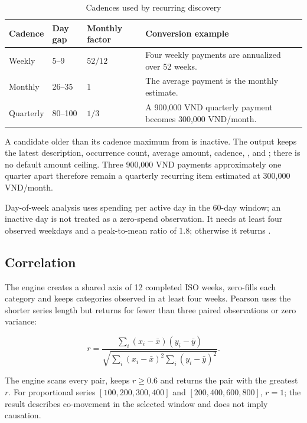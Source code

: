 \begin{table}[H]
  \centering
  \caption{Cadences used by recurring discovery}
  \label{tab:app-cadences}
  \begin{tabularx}{0.9\textwidth}{@{}L{3.2cm}C{2.4cm}C{2.4cm}C{3.2cm}@{}}
    \toprule
    \textbf{Cadence} & \textbf{Day gap} & \textbf{Monthly factor} & \textbf{Conversion example} \\
    \midrule
    Weekly & 5--9 & $52/12$ & Four weekly payments are annualized over 52 weeks. \\
    Monthly & 26--35 & $1$ & The average payment is the monthly estimate. \\
    Quarterly & 80--100 & $1/3$ & A 900,000 VND quarterly payment becomes 300,000 VND/month. \\
    \bottomrule
  \end{tabularx}
\end{table}

A candidate older than its cadence maximum from  is inactive. The output keeps the latest description, occurrence count, average amount, cadence, ,  and ; there is no default amount ceiling. Three 900,000 VND payments approximately one quarter apart therefore remain a quarterly recurring item estimated at 300,000 VND/month.

Day-of-week analysis uses spending per active day in the 60-day window; an inactive day is not treated as a zero-spend observation. It needs at least four observed weekdays and a peak-to-mean ratio of 1.8; otherwise it returns .

\subsection{Correlation}

The engine creates a shared axis of 12 completed ISO weeks, zero-fills each category and keeps categories observed in at least four weeks. Pearson uses the shorter series length but returns  for fewer than three paired observations or zero variance:

\begin{equation}
  r=\frac{\sum_i(x_i-\bar x)(y_i-\bar y)}
  {\sqrt{\sum_i(x_i-\bar x)^2\sum_i(y_i-\bar y)^2}}.
\end{equation}

The engine scans every pair, keeps $r\geq0.6$ and returns the pair with the greatest $r$. For proportional series $[100,200,300,400]$ and $[200,400,600,800]$, $r=1$; the result describes co-movement in the selected window and does not imply causation.

